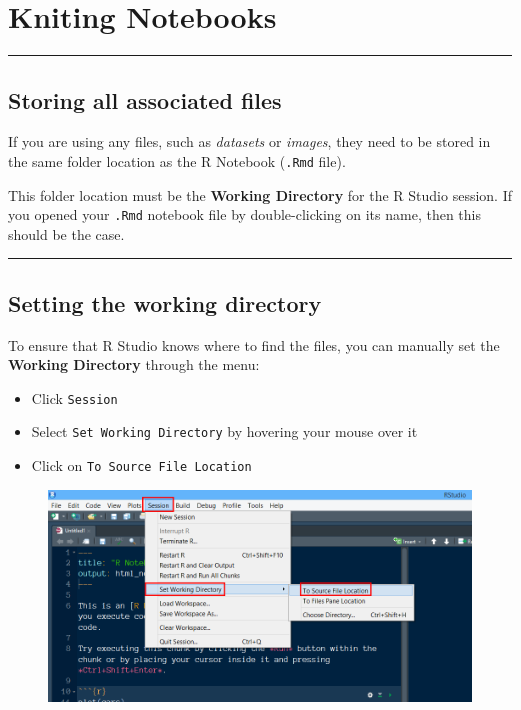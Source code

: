 \documentclass[]{book}
\providecommand{\tightlist}{%
  \setlength{\itemsep}{0pt}\setlength{\parskip}{0pt}}
\theoremstyle{definition}
\theoremstyle{definition}
\theoremstyle{definition}
\theoremstyle{remark}
\begin{document}
\chapter{Kniting Notebooks}\label{kniting-notebooks}

\begin{center}\rule{0.5\linewidth}{\linethickness}\end{center}

\section{Storing all associated
files}\label{storing-all-associated-files}

If you are using any files, such as \emph{datasets} or \emph{images},
they need to be stored in the same folder location as the R Notebook
(\texttt{.Rmd} file).

This folder location must be the \textbf{Working Directory} for the R
Studio session. If you opened your \texttt{.Rmd} notebook file by
double-clicking on its name, then this should be the case.

\begin{center}\rule{0.5\linewidth}{\linethickness}\end{center}

\section{Setting the working
directory}\label{setting-the-working-directory}

To ensure that R Studio knows where to find the files, you can manually
set the \textbf{Working Directory} through the menu:

\begin{itemize}
\tightlist
\item
  Click \texttt{Session}
\item
  Select \texttt{Set\ Working\ Directory} by hovering your mouse over it
\item
  Click on \texttt{To\ Source\ File\ Location}
\end{itemize}

\begin{figure}
\centering
\includegraphics{img/Set_wd_source.png}
\caption{}
\end{figure}
\end{document}
